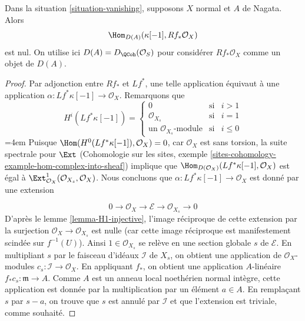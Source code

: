 \begin{lemma} \label{lemma-R1-injective} Dans la situation \ref{situation-vanishing}, supposons $X$ normal et $A$ de Nagata. Alors $$
\Hom_{D(A)}(\kappa[-1], Rf_*\mathcal{O}_X)
$$ est nul. On utilise ici $D(A) = D_\QCoh(\mathcal{O}_S)$ pour considérer $Rf_*\mathcal{O}_X$ comme un objet de $D(A)$. \end{lemma}

\begin{proof} Par adjonction entre $Rf_*$ et $Lf^*$, une telle application équivaut à une application $\alpha : Lf^*\kappa[-1] \to \mathcal{O}_X$. Remarquons que $$
H^i(Lf^*\kappa[-1]) =
\left\{
\begin{matrix}
0 & \text{si} & i > 1 \\
\mathcal{O}_{X_s} & \text{si} & i = 1 \\
\text{un }\mathcal{O}_{X_s}\text{-module} & \text{si} & i \leq 0
\end{matrix}
\right.
$$
\begingroup\emergencystretch=4em
Puisque $\Hom(H^0(Lf^*\kappa[-1]), \mathcal{O}_X) = 0$, car $\mathcal{O}_X$ est sans torsion, la suite spectrale pour $\Ext$ (Cohomologie sur les sites, exemple \ref{sites-cohomology-example-hom-complex-into-sheaf}) implique que $\Hom_{D(\mathcal{O}_X)}(Lf^*\kappa[-1], \mathcal{O}_X)$ est égal à $\Ext^1_{\mathcal{O}_X}(\mathcal{O}_{X_s}, \mathcal{O}_X)$. Nous concluons que $\alpha : Lf^*\kappa[-1] \to \mathcal{O}_X$ est donné par une extension\par\endgroup
$$
0 \to \mathcal{O}_X \to \mathcal{E} \to \mathcal{O}_{X_s} \to 0
$$ D'après le lemme \ref{lemma-H1-injective}, l'image réciproque de cette extension par la surjection $\mathcal{O}_X \to \mathcal{O}_{X_s}$ est nulle (car cette image réciproque est manifestement scindée sur $f^{-1}(U)$). Ainsi $1 \in \mathcal{O}_{X_s}$ se relève en une section globale $s$ de $\mathcal{E}$. En multipliant $s$ par le faisceau d'idéaux $\mathcal{I}$ de $X_s$, on obtient une application de $\mathcal{O}_X$-modules $c_s : \mathcal{I} \to \mathcal{O}_X$. En appliquant $f_*$, on obtient une application $A$-linéaire $f_*c_s : \mathfrak m \to A$. Comme $A$ est un anneau local noethérien normal intègre, cette application est donnée par la multiplication par un élément $a \in A$. En remplaçant $s$ par $s -  a$, on trouve que $s$ est annulé par $\mathcal{I}$ et que l'extension est triviale, comme souhaité. \end{proof}

